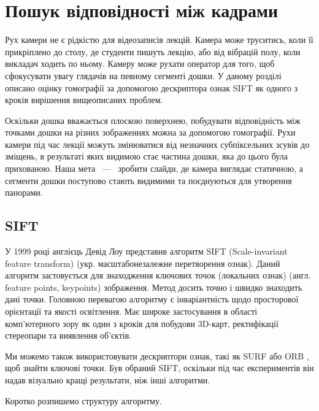 \section{Пошук відповідності між кадрами}

Рух камери не є рідкістю для відеозаписів лекцій. Камера може труситись,
коли її прикріплено до столу, де студенти пишуть лекцію, або від
вібрацій полу, коли викладач ходить по ньому. Камеру може рухати
оператор для того, щоб сфокусувати увагу глядачів на певному сегменті
дошки. У даному розділі описано оцінку гомографії за допомогою
дескриптора ознак SIFT як одного з кроків вирішення вищеописаних
проблем.

Оскільки дошка вважається плоскою поверхнею, побудувати відповідність
між точками дошки на різних зображеннях можна за допомогою гомографії.
Рухи камери під час лекції можуть змінюватися від незначних
субпіксельних зсувів до зміщень, в результаті яких видимою стає частина
дошки, яка до цього була прихованою. Наша мета ~---~ зробити слайди, де
камера виглядає статичною, а сегменти дошки поступово стають видимими та
поєднуються для утворення панорами.

\subsection{SIFT}

У 1999 році англієць Девід Лоу представив алгоритм SIFT (Scale-invariant feature transform)
\cite{sift} (укр. масштабонезалежне перетворення ознак). Даний алгоритм
застовується для знаходження ключових точок (локальних ознак) (англ. feature points, keypoints) зображення. 
Метод досить точно і швидко знаходить дані точки.
Головною перевагою алгоритму є інваріантність щодо просторової орієнтації та якості освітлення.
Має широке застосування в області комп'ютерного зору як один з кроків для побудови 3D-карт,
ректифікації стереопари та виявлення об'єктів.

Ми можемо також використовувати дескриптори ознак, такі як SURF \cite{surf} або ORB \cite{orb}, 
щоб знайти ключові точки. Був обраний SIFT, 
оскільки під час експериментів він надав візуально кращі результати, ніж 
інші алгоритми.

Коротко розпишемо структуру алгоритму.

